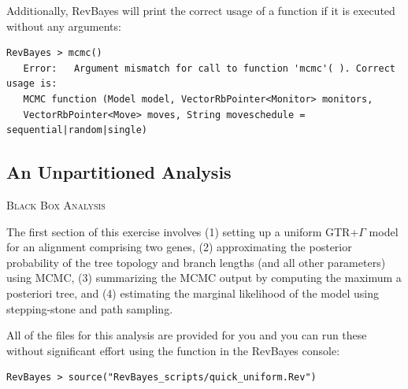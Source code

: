 Additionally, RevBayes will print the correct usage of a function if it is executed without any arguments:
{\tt \small \begin{snugshade*}
\begin{lstlisting}
RevBayes > mcmc()
   Error:   Argument mismatch for call to function 'mcmc'( ). Correct usage is:
   MCMC function (Model model, VectorRbPointer<Monitor> monitors,
   VectorRbPointer<Move> moves, String moveschedule = sequential|random|single)
\end{lstlisting}
\end{snugshade*}}


%





\bigskip
\subsection{An Unpartitioned Analysis}\label{secUnif} 

{\large \textcolor{mycol}{\textsc{Black Box Analysis}}}

The first section of this exercise involves 
(1) setting up a uniform GTR+$\Gamma$ model for an alignment comprising two genes, 
(2) approximating the posterior probability of the tree topology and branch lengths (and all other parameters) using MCMC,  
(3) summarizing the MCMC output by computing the maximum a posteriori tree, and
(4) estimating the marginal likelihood of the model using stepping-stone and path sampling. 

All of the files for this analysis are provided for you and you can run these without significant effort using the  function in the RevBayes console:
{\tt \begin{snugshade*}
\begin{lstlisting}
RevBayes > source("RevBayes_scripts/quick_uniform.Rev")
\end{lstlisting}
\end{snugshade*}}

